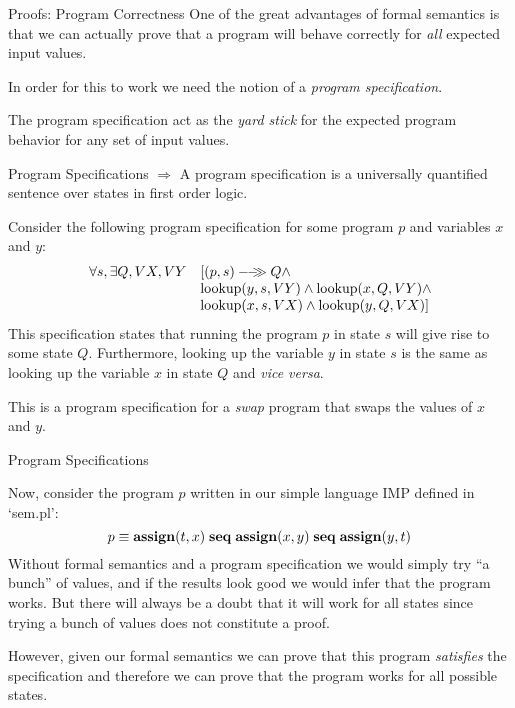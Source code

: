 \documentclass{beamer}
\begin{document}
\begin{frame}[fragile]{Proofs: Program Correctness}
One of the great advantages of formal semantics is that we can actually prove that
a program will behave correctly for {\em all} expected input values.

\vspace{.1in}

In order for this to work we need the notion of a {\em program specification}.


\vspace{.1in}

The program specification act as the {\em yard stick} for the expected program behavior
for any set of input values.

\end{frame}

\begin{frame}[fragile]{Program Specifications}
$\Rightarrow$ A program specification is a universally quantified sentence over states in first order logic.

\vspace{.1in}

Consider the following program specification for some program $p$ and variables $x$ and $y$:
\[
\begin{array}{rl}
\forall s,\exists Q,VX,VY& [{(p,s)}-\!\!-\!\!\!\!\gg{Q} \wedge \\
   		& {\rm lookup}(y,s,VY) \wedge {\rm lookup}(x,Q,VY)\wedge \\
	           & {\rm lookup}(x,s,VX) \wedge{\rm lookup}(y,Q,VX) ]
\end{array}
\]
This specification states that running the program $p$ in state $s$ will give rise to some state $Q$.
Furthermore, looking up the variable $y$ in state $s$ is the same as looking up the variable $x$ in
state $Q$ and {\em vice versa}.

\vspace{.1in}

This is a program specification for a {\em swap} program that swaps the values of $x$ and $y$.
\end{frame}

\begin{frame}[fragile]{Program Specifications}

Now, consider the  program $p$ written in our simple language IMP defined in `sem.pl':
\[
p \equiv {\bf assign}(t, x)\; {\bf  seq}\; {\bf assign}(x,y) \; {\bf seq}\; {\bf assign}(y, t)
\]
Without formal semantics and a program specification we would  simply try ``a bunch'' of values, and if the results
look good we would infer that the program works.  But there will always be a doubt that it will work for all states
since trying a bunch of values does not constitute a proof.

\vspace{.1in}

However, given our formal semantics we can prove that this program {\em satisfies} the specification
and therefore we can prove that the program works for all possible states.
\end{frame}
\end{document}
